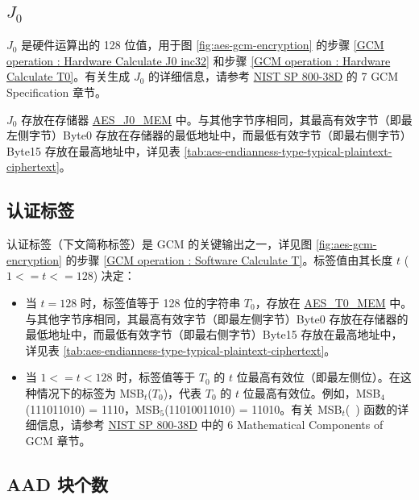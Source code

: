 \documentclass[main\_\_CN.tex]{subfiles}
\begin{document}
\subsection{\texorpdfstring{$J_0$}{J0}} \label{Label J0}

$J_0$ 是硬件运算出的 128 位值，用于图 \ref{fig:aes-gcm-encryption} 的步骤 \ref{GCM operation : Hardware Calculate J0 inc32} 和步骤 \ref{GCM operation : Hardware Calculate T0}。有关生成 $J_0$ 的详细信息，请参考 \href{https://nvlpubs.nist.gov/nistpubs/Legacy/SP/nistspecialpublication800-38d.pdf}{NIST SP 800-38D} 的 7 GCM Specification 章节。

$J_0$ 存放在存储器 \label{memdesc:AESJ0MEM}\hyperref[memdesc:AESJ0MEM]{AES\_J0\_MEM} 中。与其他字节序相同，其最高有效字节（即最左侧字节）Byte0 存放在存储器的最低地址中，而最低有效字节（即最右侧字节）Byte15 存放在最高地址中，详见表 \ref{tab:aes-endianness-type-typical-plaintext-ciphertext}。


\subsection{认证标签}\label{Label Authenticated Tag}

认证标签（下文简称标签）是 GCM 的关键输出之一，详见图 \ref{fig:aes-gcm-encryption} 的步骤 \ref{GCM operation : Software Calculate T}。标签值由其长度 $t$
($1 <= t <= 128$) 决定：

\begin{itemize}
    \item 当 $t = 128$ 时，标签值等于 128 位的字符串 $T_0$，存放在 \label{memdesc:AEST0MEM}\hyperref[memdesc:AEST0MEM]{AES\_T0\_MEM} 中。与其他字节序相同，其最高有效字节（即最左侧字节）Byte0 存放在存储器的最低地址中，而最低有效字节（即最右侧字节）Byte15 存放在最高地址中，详见表 \ref{tab:aes-endianness-type-typical-plaintext-ciphertext}。

    \item 当 $1 <= t < 128$ 时，标签值等于 $T_0$ 的 $t$ 位最高有效位（即最左侧位）。在这种情况下的标签为 MSB$_t$($T_0$)，代表 $T_0$ 的 $t$ 位最高有效位。例如，MSB$_4$(111011010) = 1110，MSB$_5$(11010011010) = 11010。有关 MSB$_t$(\ ) 函数的详细信息，请参考 \href{https://nvlpubs.nist.gov/nistpubs/Legacy/SP/nistspecialpublication800-38d.pdf}{NIST SP 800-38D} 中的 6 Mathematical Components of GCM 章节。

\end{itemize}


\subsection{AAD 块个数}\label{sec:aes-aad-block-number}
\end{document}
